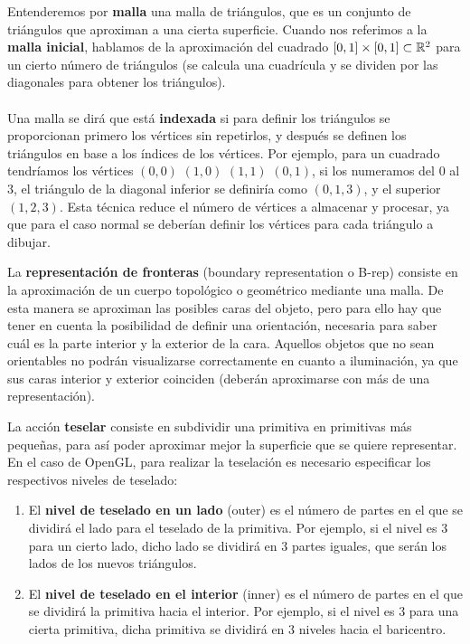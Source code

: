 \begin{definicion} Entenderemos por \textbf{malla} una malla de triángulos, que es un conjunto de triángulos que aproximan a una cierta superficie. Cuando nos referimos a la \textbf{malla inicial}, hablamos de la aproximación del cuadrado $[0,1]\times[0,1]\subset \mathbb{R}^2$ para un cierto número de triángulos (se calcula una cuadrícula y se dividen por las diagonales para obtener los triángulos).\\
\\Una malla se dirá que está \textbf{indexada} si para definir los triángulos se proporcionan primero los vértices sin repetirlos, y después se definen los triángulos en base a los índices de los vértices. Por ejemplo, para un cuadrado tendríamos los vértices $(0,0)$ $(1,0)$ $(1,1)$ $(0,1)$, si los numeramos del $0$ al $3$, el triángulo de la diagonal inferior se definiría como $(0,1,3)$, y el superior $(1,2,3)$. Esta técnica reduce el número de vértices a almacenar y procesar, ya que para el caso normal se deberían definir los vértices para cada triángulo a dibujar.
\end{definicion}

\begin{definicion} La \textbf{representación de fronteras} (boundary representation o B-rep) consiste en la aproximación de un cuerpo topológico o geométrico mediante una malla. De esta manera se aproximan las posibles caras del objeto, pero para ello hay que tener en cuenta la posibilidad de definir una orientación, necesaria para saber cuál es la parte interior y la exterior de la cara. Aquellos objetos que no sean orientables no podrán visualizarse correctamente en cuanto a iluminación, ya que sus caras interior y exterior coinciden (deberán aproximarse con más de una representación).
\end{definicion}

\begin{definicion} La acción \textbf{teselar} consiste en subdividir una primitiva en primitivas más pequeñas, para así poder aproximar mejor la superficie que se quiere representar. En el caso de OpenGL, para realizar la teselación es necesario especificar los respectivos niveles de teselado:
	\begin{enumerate}
		\item El \textbf{nivel de teselado en un lado} (outer) es el número de partes en el que se dividirá el lado para el teselado de la primitiva. Por ejemplo, si el nivel es $3$ para un cierto lado, dicho lado se dividirá en $3$ partes iguales, que serán los lados de los nuevos triángulos.
		\item El \textbf{nivel de teselado en el interior} (inner) es el número de partes en el que se dividirá la primitiva hacia el interior. Por ejemplo, si el nivel es $3$ para una cierta primitiva, dicha primitiva se dividirá en $3$ niveles hacia el baricentro.
	\end{enumerate}
\end{definicion}

